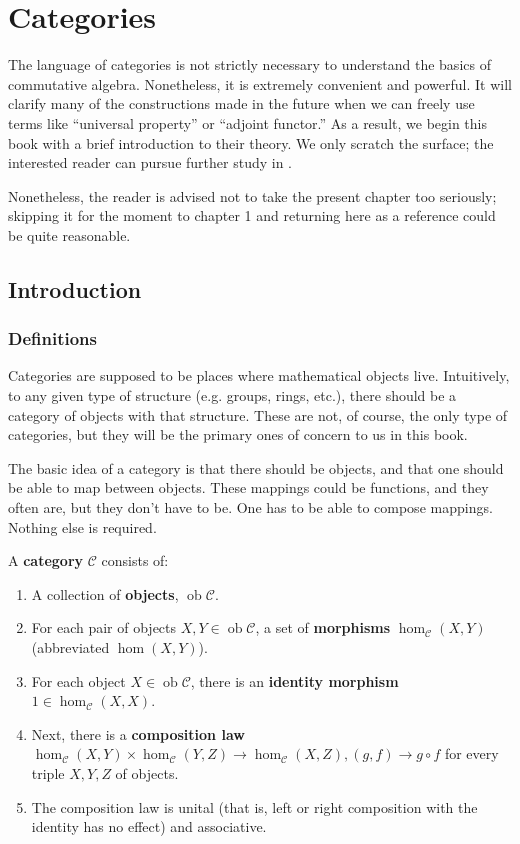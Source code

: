 \setcounter{chapter}{-1}
\chapter{Categories}
\label{categorychapter}


The language of categories is not strictly necessary to understand the basics
of  commutative
algebra. Nonetheless, it is extremely convenient and powerful. It will clarify
many of the constructions made in the future when we can freely use terms like
``universal property'' or ``adjoint functor.'' As a result, we begin this book
with a brief introduction to their theory. We only scratch the surface; the
interested reader can pursue further study in \cite{Ma98}.


Nonetheless, the reader is advised not to take the present chapter too
seriously; skipping it for the moment to chapter 1 and returning here as a
reference could be quite reasonable.

\section{Introduction}
\newcommand{\ob}{\operatorname{ob}}

\subsection{Definitions}

Categories are supposed to be places where mathematical objects live.
Intuitively, to any given type of structure (e.g. groups, rings, etc.),
there should be a
category of objects with that structure. These are not, of course, the only
type of categories, but they will be the primary ones of concern to us in this
book.


The basic idea of a category is that there should be objects, and that one
should be able to map between objects. These mappings could be functions, and
they often are, but they don't have to be. One has to be able to compose
mappings. Nothing else is required.

\begin{definition}
A \textbf{category} $\mathcal{C}$ consists of:
\begin{enumerate}
\item  A collection of \textbf{objects},
$\ob \mathcal{C}$.
\item For each pair of objects $X, Y \in
\ob \mathcal{C}$, a set
of \textbf{morphisms} $\hom_{\mathcal{C}}(X, Y)$ (abbreviated $\hom(X,Y)$).
\item For each object $X \in \ob\mathcal{C}$, there is an \textbf{identity
morphism}
$1 \in \hom_{\mathcal{C}}(X, X)$.
\item Next, there is a \textbf{composition law}
$\hom_{\mathcal{C}}(X, Y) \times \hom_{\mathcal{C}}(Y, Z) \to
\hom_{\mathcal{C}}(X, Z), (g, f) \to g
\circ f$ for every
triple $X, Y, Z$ of objects.
\item  The composition law is unital (that is, left or right composition with
the identity has no effect) and associative.
\end{enumerate}
\end{definition}

